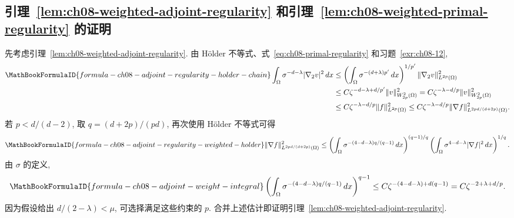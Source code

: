 \subsection{引理~\ref{lem:ch08-weighted-adjoint-regularity} 和引理~\ref{lem:ch08-weighted-primal-regularity} 的证明}
\label{sec:ch08-proofs-weighted-regularity-lemmas}
\setcounter{thmcount}{0}
\setcounter{equation}{0}

先考虑引理~\ref{lem:ch08-weighted-adjoint-regularity}. 由 Hölder 不等式、式~\eqref{eq:ch08-primal-regularity} 和习题~\ref{exr:ch08-12},
\begin{align*}
\MathBookFormulaID{formula-ch08-adjoint-regularity-holder-chain}
\int_\Omega\sigma^{-d-\lambda}|\nabla_2v|^2\,dx
&\leq\left(\int_\Omega\sigma^{-(d+\lambda)p'}\,dx\right)^{1/p'}
\|\nabla_2v\|_{L^{2p}(\Omega)}^2\\
&\leq C\zeta^{-d-\lambda+d/p'}\|v\|_{W_{2p}^2(\Omega)}^2
=C\zeta^{-\lambda-d/p}\|v\|_{W_{2p}^2(\Omega)}^2\\
&\leq C\zeta^{-\lambda-d/p}\|f\|_{L^{2p}(\Omega)}^2
\leq C\zeta^{-\lambda-d/p}
\|\nabla f\|_{L^{2pd/(d+2p)}(\Omega)}^2.
\end{align*}
若 $p<d/(d-2)$, 取 $q=(d+2p)/(pd)$, 再次使用 Hölder 不等式可得
\[
\MathBookFormulaID{formula-ch08-adjoint-regularity-weighted-holder}
\|\nabla f\|_{L^{2pd/(d+2p)}(\Omega)}^2
\leq\left(\int_\Omega\sigma^{-(4-d-\lambda)q/(q-1)}\,dx\right)^{(q-1)/q}
\left(\int_\Omega\sigma^{4-d-\lambda}|\nabla f|^2\,dx\right)^{1/q}.
\]
由 $\sigma$ 的定义,
\[
\MathBookFormulaID{formula-ch08-adjoint-weight-integral}
\left(\int_\Omega\sigma^{-(4-d-\lambda)q/(q-1)}\,dx\right)^{q-1}
\leq C\zeta^{-(4-d-\lambda)+d(q-1)}
=C\zeta^{-2+\lambda+d/p}.
\]
因为假设给出 $d/(2-\lambda)<\mu$, 可选择满足这些约束的 $p$. 合并上述估计即证明引理~\ref{lem:ch08-weighted-adjoint-regularity}.

